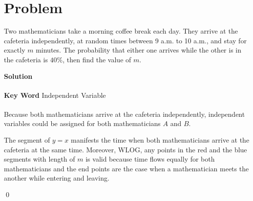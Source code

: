 \documentclass{article}
\newenvironment{solution}{\begin{trivlist}\item[]{\bf Solution}}{\qed \end{trivlist}}
\begin{document}
\newpage
\section*{Problem}
Two mathematicians take a morning coffee break each day. They arrive at the cafeteria independently, at random times between 9 a.m. to 10 a.m., and stay for exactly $m$ minutes. The probability that either one arrives while the other is in the cafeteria is $40\%$, then find the value of $m$.
\begin{solution}
\\\\
\textbf{Key Word} Independent Variable
\\\\
Because both mathematicians arrive at the cafeteria independently, independent variables could be assigned for both mathematicians $A$ and $B$.
\begin{center}
\end{center}
The segment of $y=x$ manifests the time when both mathematicians arrive at the cafeteria at the same time. Moreover, WLOG, any points in the red and the blue segments with length of $m$ is valid because time flows equally for both mathematicians and the end points are the case when a mathematician meets the another while entering and leaving.
\begin{center}
\end{center}
\end{solution}
\end{document}
